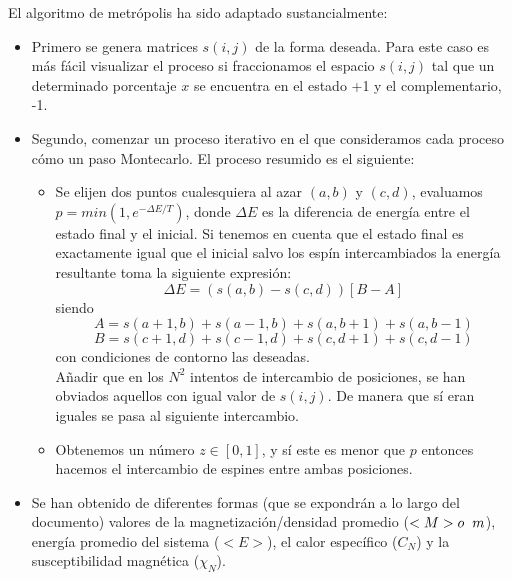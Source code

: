 \documentclass[12pt,paper]{article}
\begin{document}
El algoritmo de metrópolis ha sido adaptado sustancialmente:
\begin{itemize}
    \item Primero se genera matrices $s(i,j)$ de la forma deseada. Para este caso es más fácil visualizar el proceso si fraccionamos el espacio $s(i,j)$ tal que un determinado porcentaje $x$ se encuentra en el estado +1 y el complementario, -1.
    
    \item Segundo, comenzar un proceso iterativo en el que consideramos cada proceso cómo un paso Montecarlo. El proceso resumido es el siguiente:
    \begin{itemize}
        \item Se elijen dos puntos cualesquiera al azar $(a,b)$ y $(c,d)$, evaluamos $p=min(1,e^{- \Delta E/T})$, donde $\Delta E$ es la diferencia de energía entre el estado final y el inicial. Si tenemos en cuenta que el estado final es exactamente igual que el inicial salvo los espín intercambiados la energía resultante toma la siguiente expresión:
        \begin{equation}
            \Delta E = (s(a,b) - s(c,d))[B-A]
        \end{equation}
        siendo
        \begin{equation*}
            A = s(a+1,b)+s(a-1,b)+s(a,b+1)+s(a,b-1)
        \end{equation*}
        \begin{equation*}
            B = s(c+1,d)+s(c-1,d)+s(c,d+1)+s(c,d-1)
        \end{equation*}
        con condiciones de contorno las deseadas.\\
        
        Añadir que en los $N^2$ intentos de intercambio de posiciones, se han obviados aquellos con igual valor de $s(i,j)$. De manera que sí eran iguales se pasa al siguiente intercambio.
        \item Obtenemos un número $z \in [0,1]$, y sí este es menor que $p$ entonces hacemos el intercambio de espines entre ambas posiciones.
    \end{itemize}
    \item Se han obtenido de diferentes formas (que se expondrán a lo largo del documento) valores de la magnetización/densidad promedio ($<M> o \hspace{2mm} m$), energía promedio del sistema ($<E>$), el calor específico ($C_N$) y la susceptibilidad magnética ($\chi_N$).\\
    

\end{itemize}
\end{document}
